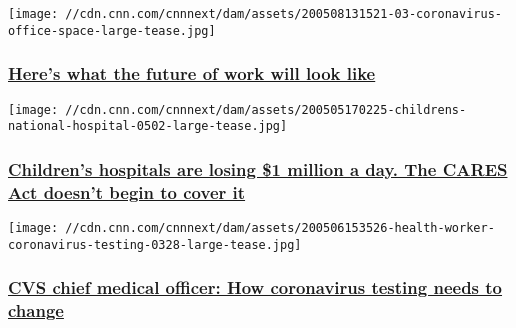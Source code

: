 \texttt{[image: //cdn.cnn.com/cnnnext/dam/assets/200508131521-03-coronavirus-office-space-large-tease.jpg]}

\hypertarget{heres-what-the-future-of-work-will-look-like}{%
\subsubsection{\texorpdfstring{\href{/2020/05/11/perspectives/work-after-coronavirus-pandemic/index.html}{Here's
what the future of work will look
like}}{Here's what the future of work will look like}}\label{heres-what-the-future-of-work-will-look-like}}

\href{/2020/05/06/perspectives/childrens-hospitals-coronavirus/index.html}{}

\texttt{[image: //cdn.cnn.com/cnnnext/dam/assets/200505170225-childrens-national-hospital-0502-large-tease.jpg]}

\hypertarget{childrens-hospitals-are-losing-1-million-a-day-the-cares-act-doesnt-begin-to-cover-it}{%
\subsubsection{\texorpdfstring{\href{/2020/05/06/perspectives/childrens-hospitals-coronavirus/index.html}{Children's
hospitals are losing \$1 million a day. The CARES Act doesn't begin to
cover
it}}{Children's hospitals are losing \$1 million a day. The CARES Act doesn't begin to cover it}}\label{childrens-hospitals-are-losing-1-million-a-day-the-cares-act-doesnt-begin-to-cover-it}}

\href{/2020/05/07/perspectives/cvs-coronavirus-testing/index.html}{}

\texttt{[image: //cdn.cnn.com/cnnnext/dam/assets/200506153526-health-worker-coronavirus-testing-0328-large-tease.jpg]}

\hypertarget{cvs-chief-medical-officer-how-coronavirus-testing-needs-to-change}{%
\subsubsection{\texorpdfstring{\href{/2020/05/07/perspectives/cvs-coronavirus-testing/index.html}{CVS
chief medical officer: How coronavirus testing needs to
change}}{CVS chief medical officer: How coronavirus testing needs to change}}\label{cvs-chief-medical-officer-how-coronavirus-testing-needs-to-change}}

\href{/2020/05/06/perspectives/women-economic-policies-coronavirus/index.html}{}

